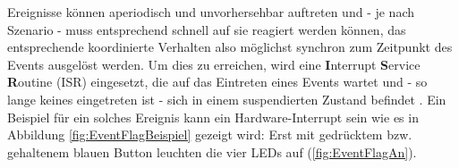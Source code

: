 \documentclass{llncs}
\begin{document}
Ereignisse können aperiodisch und unvorhersehbar auftreten und - je nach Szenario - muss entsprechend schnell auf sie reagiert werden können, das entsprechende koordinierte Verhalten also möglichst synchron zum Zeitpunkt des Events ausgelöst werden. Um dies zu erreichen, wird eine \textbf{I}nterrupt \textbf{S}ervice \textbf{R}outine (ISR) eingesetzt, die auf das Eintreten eines Events wartet und - so lange keines eingetreten ist - sich in einem suspendierten Zustand befindet \autocite[vgl.][87]{Cooling2017}. Ein Beispiel für ein solches Ereignis kann ein Hardware-Interrupt sein wie es in Abbildung \ref{fig:EventFlagBeispiel} gezeigt wird: Erst mit gedrücktem bzw. gehaltenem blauen Button leuchten die vier LEDs auf (\ref{fig:EventFlagAn}).\\
\end{document}
